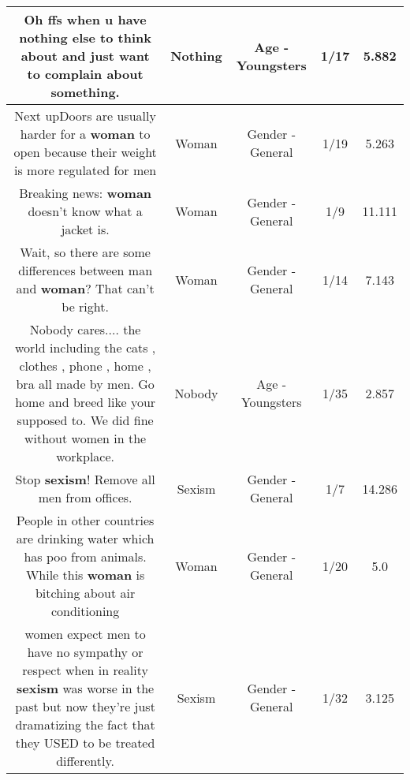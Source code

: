 \documentclass[11pt]{article}
\newlength\mylength
\begin{document}
\begin{center}
\begin{longtable}{|C{.65\mylength}|C{.30\mylength}|C{.12\mylength}|C{.12\mylength}|C{.12\mylength}|}
  \small Oh ffs when u have \textbf{nothing} else to think about and just want to complain about something.\normalsize   & Nothing & Age - Youngsters & 1/17 & 5.882 \\  \hline
  \small Next upDoors are usually harder for a \textbf{woman} to open because their weight is more regulated for men\normalsize   & Woman & Gender - General & 1/19 & 5.263 \\  \hline
  \small Breaking news: \textbf{woman} doesn't know what a jacket is.\normalsize   & Woman & Gender - General & 1/9 & 11.111 \\  \hline
  \small Wait, so there are some differences between man and \textbf{woman}? That can't be right.\normalsize   & Woman & Gender - General & 1/14 & 7.143 \\  \hline
  \small Nobody cares....   the world including the cats , clothes , phone , home , bra all made by men.  Go home and breed like your supposed to.  We did fine without women in the workplace.\normalsize   & Nobody & Age - Youngsters & 1/35 & 2.857 \\  \hline
  \small Stop \textbf{sexism}! Remove all men from offices.\normalsize   & Sexism & Gender - General & 1/7 & 14.286 \\  \hline
  \small People in other countries are drinking water which has poo from animals. While this \textbf{woman} is bitching about air conditioning\normalsize   & Woman & Gender - General & 1/20 & 5.0 \\  \hline
  \small women expect men to have no sympathy or respect when in reality \textbf{sexism} was worse in the past but now they're just dramatizing the fact that they USED to be treated differently.\normalsize   & Sexism & Gender - General & 1/32 & 3.125 \\  \hline

\end{longtable}
\end{center}
\end{document}
